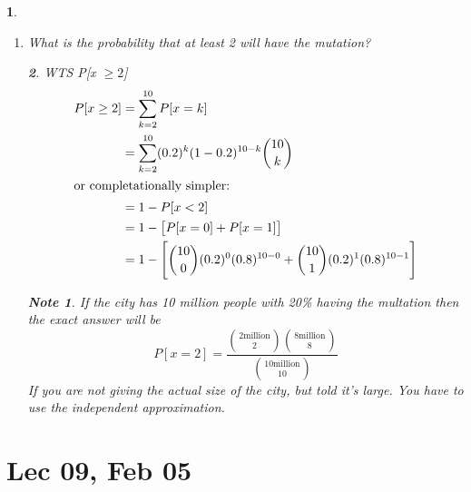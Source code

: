 \documentclass[11pt]{article}
\newtheorem*{note}{Note}
\newtheorem*{solution}{\framebox{Sol}}
\newtheorem{example}{\framebox{Ex}}[section]
\begin{document}
\begin{example}
\begin{enumerate}
\begin{solution}
                        \end{solution}
                        \newpage
                    \item What is the probability that at least 2 will have the mutation?\\
                        \begin{solution}
                            WTS P[x $\geq 2$] \\
                            \begin{align*}
                                P [ x \geq 2]   &= \sum^{10}_{k=2} P[x = k] \\
                                                &= \sum^{10}_{k=2} (0.2)^k (1-0.2)^{10-k} \binom{10}{k} \\
                                \intertext{or completationally simpler:}
                                                &= 1 - P[x < 2]\\
                                                &= 1 - \big[P [x=0] + P[x = 1]\big]\\
                                                &= 1 - \Bigg[\binom{10}{0}(0.2)^0(0.8)^{10-0} + \binom{10}{1}(0.2)^1(0.8)^{10-1}\Bigg]\\
                            \end{align*}
                        \end{solution}
                        \begin{note}
                            If the city has 10 million people with 20\% having the multation then the exact answer will be 
                            $$P[x=2] = \frac{\binom{2 \text{million}}{2} \binom{8 \text{million}}{8}}{\binom{10 \text{million}}{10}}$$
                            If you are not giving the actual size of the city, but told it's large. 
                            You have to use the independent approximation.
                        \end{note}
                \end{enumerate} 
            \end{example}
            \newpage

    \section{Lec 09, Feb 05}
\end{document}
